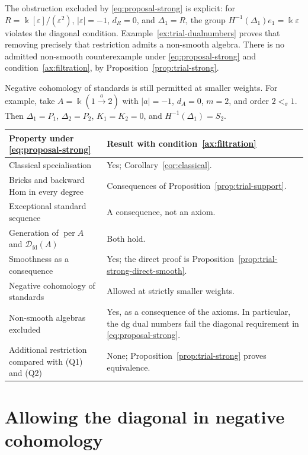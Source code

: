 \documentclass[11pt,a4paper]{article}
\newcommand{\D}{\mathcal D}
\newcommand{\std}{\Delta}
\DeclareMathOperator{\fd}{fd}
\DeclareMathOperator{\per}{per}
\theoremstyle{plain}
\theoremstyle{definition}
\numberwithin{equation}{section}
\begin{document}
The obstruction excluded by \eqref{eq:proposal-strong} is explicit:
for $R=\Bbbk[\varepsilon]/(\varepsilon^2)$, $|\varepsilon|=-1$,
$d_R=0$, and $\std_1=R$, the group
$H^{-1}(\std_1)e_1=\Bbbk\varepsilon$ violates the diagonal condition.
Example~\ref{ex:trial-dualnumbers} proves that removing precisely
that restriction admits a non-smooth algebra. There is no admitted
non-smooth counterexample under \eqref{eq:proposal-strong} and
condition~\ref{ax:filtration}, by Proposition~\ref{prop:trial-strong}.

Negative cohomology of standards is still permitted at smaller
weights. For example, take
$A=\Bbbk(1\xrightarrow{a}2)$ with $|a|=-1$, $d_A=0$, $m=2$,
and order $2<_\sigma1$. Then $\std_1=P_1$, $\std_2=P_2$,
$K_1=K_2=0$, and $H^{-1}(\std_1)=S_2$.

\begin{center}\small
\begin{tabularx}{\linewidth}{@{}>{\raggedright\arraybackslash}p{.36\linewidth}>{\raggedright\arraybackslash}X@{}}
\toprule
Property under \eqref{eq:proposal-strong} & Result with
condition~\ref{ax:filtration} \\\midrule
Classical specialisation & Yes; Corollary~\ref{cor:classical}.\\
Bricks and backward Hom in every degree & Consequences of
Proposition~\ref{prop:trial-support}.\\
Exceptional standard sequence & A consequence, not an axiom.\\
Generation of $\per A$ and $\D_{\fd}(A)$ & Both hold.\\
Smoothness as a consequence & Yes; the direct proof is
Proposition~\ref{prop:trial-strong-direct-smooth}.\\
Negative cohomology of standards & Allowed at strictly smaller weights.\\
Non-smooth algebras excluded & Yes, as a consequence of the axioms.
In particular, the dg dual numbers fail the diagonal requirement
in \eqref{eq:proposal-strong}.\\
Additional restriction compared with (Q1) and (Q2) & None;
Proposition~\ref{prop:trial-strong} proves equivalence.\\
\bottomrule
\end{tabularx}
\end{center}

\section{Allowing the diagonal in negative cohomology}
\label{sec:proposal-weak}
\end{document}
